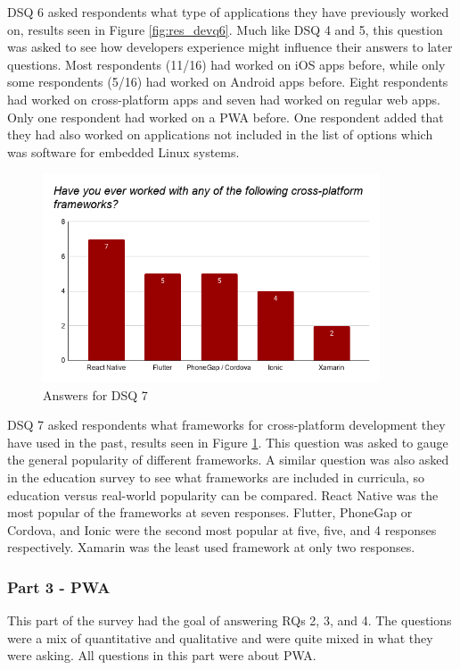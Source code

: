 \documentclass[a4paper,12pt]{article}
\begin{document}
DSQ 6 asked respondents what type of applications they have previously worked on, results seen in Figure \ref{fig:res_devq6}. Much like DSQ 4 and 5, this question was asked to see how developers experience might influence their answers to later questions. Most respondents (11/16) had worked on iOS apps before, while only some respondents (5/16) had worked on Android apps before. Eight respondents had worked on cross-platform apps and seven had worked on regular web apps. Only one respondent had worked on a PWA before. One respondent added that they had also worked on applications not included in the list of options which was software for embedded Linux systems.

\begin{figure}[ht!]
    \centering
    \includegraphics[width=10cm]{img/Results/dsq7.png}
    \caption{Answers for DSQ 7}
    \label{fig:res_devq7}
\end{figure}

DSQ 7 asked respondents what frameworks for cross-platform development they have used in the past, results seen in Figure \ref{fig:res_devq7}. This question was asked to gauge the general popularity of different frameworks. A similar question was also asked in the education survey to see what frameworks are included in curricula, so education versus real-world popularity can be compared. React Native was the most popular of the frameworks at seven responses. Flutter, PhoneGap or Cordova, and Ionic were the second most popular at five, five, and 4 responses respectively. Xamarin was the least used framework at only two responses.

\subsubsection{Part 3 - PWA}
\label{Results_dev_part3}
This part of the survey had the goal of answering RQs 2, 3, and 4. The questions were a mix of quantitative and qualitative and were quite mixed in what they were asking. All questions in this part were about PWA.
\end{document}
